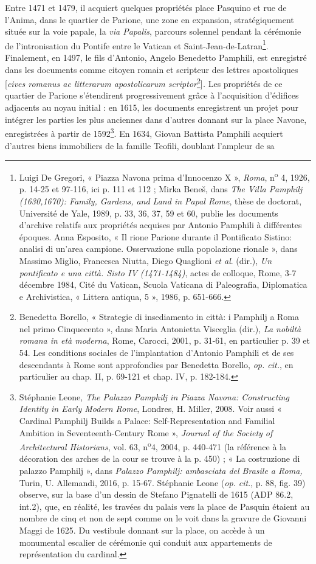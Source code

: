 \documentclass[12pt,twoside,openany]{book}
\begin{document}
Entre 1471 et 1479, il acquiert quelques propriétés place Pasquino et rue de l’Anima, dans le quartier de Parione, une zone en expansion, stratégiquement située sur la voie papale, la \textit{via Papalis}, parcours solennel pendant la cérémonie de l’intronisation du Pontife entre le Vatican et Saint-Jean-de-Latran\footnote{Luigi De Gregori, « Piazza Navona prima d’Innocenzo X », \textit{Roma}, n\textsuperscript{o} 4, 1926, p. 14-25 et 97-116, ici p. 111 et 112 ; Mirka Beneš, dans \textit{The Villa Pamphilj (1630,1670): Family, Gardens, and Land in Papal Rome}, thèse de doctorat, Université de Yale, 1989, p. 33, 36, 37, 59 et 60, publie les documents d’archive relatifs aux propriétés acquises par Antonio Pamphili à différentes époques. Anna Esposito, « Il rione Parione durante il Pontificato Sistino: analisi di un'area campione. Osservazione sulla popolazione rionale », dans Massimo Miglio, Francesca Niutta, Diego Quaglioni \textit{et al}. (dir.), \textit{Un pontificato e una città. Sisto IV (1471-1484)}, actes de colloque, Rome, 3-7 décembre 1984, Cité du Vatican, Scuola Vaticana di Paleografia, Diplomatica e Archivistica, « Littera antiqua, 5 », 1986, p. 651-666.}. Finalement, en 1497, le fils d’Antonio, Angelo Benedetto Pamphili, est enregistré dans les documents comme citoyen romain et scripteur des lettres apostoliques [\textit{cives romanus ac litterarum apostolicarum scriptor}\footnote{Benedetta Borello, « Strategie di insediamento in città: i Pamphilj a Roma nel primo Cinquecento », dans Maria Antonietta Visceglia (dir.), \textit{La nobiltà romana in età moderna}, Rome, Carocci, 2001, p. 31-61, en particulier p. 39 et 54. Les conditions sociales de l’implantation d’Antonio Pamphili et de ses descendants à Rome sont approfondies par Benedetta Borello, \textit{op. cit.}, en particulier au chap. II, p. 69-121 et chap. IV, p. 182-184.}]\textit{. }Les propriétés de ce quartier de Parione s’étendirent progressivement grâce à l’acquisition d’édifices adjacents au noyau initial : en 1615, les documents enregistrent un projet pour intégrer les parties les plus anciennes dans d’autres donnant sur la place Navone, enregistrées à partir de 1592\footnote{Stéphanie Leone, \textit{The Palazzo Pamphilj in Piazza Navona: Constructing Identity in Early Modern Rome}, Londres, H. Miller, 2008. Voir aussi « Cardinal Pamphilj Builds a Palace: Self-Representation and Familial Ambition in Seventeenth-Century Rome », \textit{Journal of the Society of Architectural Historians}, vol. 63, n\textsuperscript{o}4, 2004, p. 440-471 (la référence à la décoration des arches de la cour se trouve à la p. 450) ; « La costruzione di palazzo Pamphilj », dans \textit{Palazzo Pamphilj: ambasciata del Brasile a Roma,} Turin, U. Allemandi, 2016, p. 15-67. Stéphanie Leone (\textit{op. cit}., p. 88, fig. 39) observe, sur la base d’un dessin de Stefano Pignatelli de 1615 (ADP 86.2, int.2), que, en réalité, les travées du palais vers la place de Pasquin étaient au nombre de cinq et non de sept comme on le voit dans la gravure de Giovanni Maggi de 1625. Du vestibule donnant sur la place, on accède à un monumental escalier de cérémonie qui conduit aux appartements de représentation du cardinal.}. En 1634, Giovan Battista Pamphili acquiert d’autres biens immobiliers de la famille Teofili, doublant l’ampleur de sa 
\end{document}
